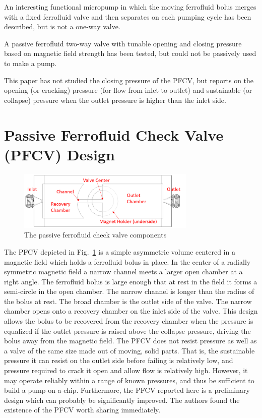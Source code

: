 \documentclass{asme2ej}
\begin{document}
An interesting functional micropump in which the
moving ferrofluid bolus merges with a fixed ferrofluid valve and then
separates on each pumping cycle has been described\cite{hatch2001ferrofluidic},
but is not a one-way valve.

A passive ferrofluid two-way valve with tunable
opening and closing pressure based on magnetic
field strength\cite{paschalis2013novel} has been tested,
but could not be passively used to make a pump.

This paper has not studied the closing pressure of the PFCV, but reports on
the opening (or cracking) pressure (for flow from inlet to outlet) and
sustainable (or collapse) pressure
when the outlet pressure is higher than the inlet side.

\section{Passive Ferrofluid Check Valve (PFCV) Design}
\begin{figure}
\centerline{\includegraphics[width=3.34in]{figure/Figure1.png}}
\caption{The passive ferrofluid check valve components}
\label{fig_components}
\end{figure}

The PFCV depicted in Fig.~\ref{fig_components} is a simple asymmetric volume
centered in a magnetic field
which holds a ferrofluid bolus in place.
In the center of a radially symmetric magnetic field
a narrow channel meets a larger open chamber at a right angle.
The ferrofluid bolus is large enough that at rest in the field it
forms a semi-circle in the open chamber. The narrow channel is
longer than the radius of the bolus at rest.
The broad chamber is the outlet side of the valve.
The narrow chamber opens onto a recovery chamber on the inlet
side of the valve.
This design allows the bolus to be recovered from the recovery
chamber when the pressure is equalized if the outlet pressure is
raised above the collapse pressure, driving the bolus away
from the magnetic field.
The PFCV does not resist pressure as well  as a
valve of the same size
made out of moving, solid parts.
That is, the sustainable
pressure it can resist on the outlet side before failing is relatively
low, and pressure required to crack it open and allow flow is
relatively high.
However, it may operate reliably within a range of
known pressures, and thus be sufficient to build a
pump-on-a-chip.
Furthermore, the PFCV reported here is a preliminary design which
can probably be significantly improved.
The authors found the
existence of the PFCV worth sharing immediately.
\end{document}
